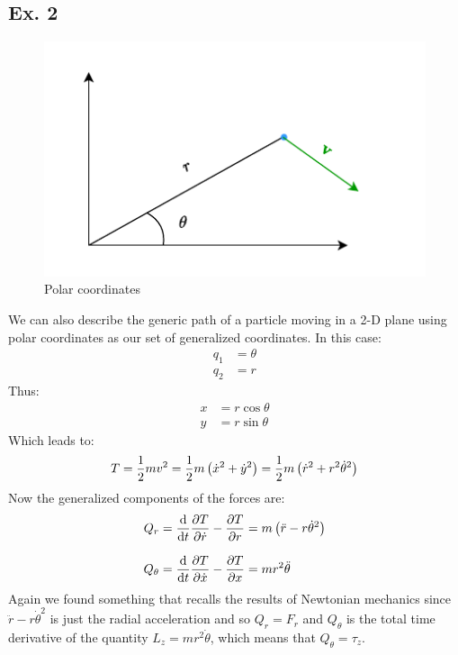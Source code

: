 \subsection{\textbf{Ex. 2}}
\begin{figure}[H]
    \centering
    \includegraphics[width=0.6\linewidth]{res/svg/polar_coordinates_free.drawio}
    \caption{Polar coordinates}
\end{figure}
We can also describe the generic path of a particle moving in a 2-D plane using polar coordinates as our set of generalized coordinates. In this case:
\begin{equation}
  \begin{split}
    q_1 &= \theta \\[8pt]
    q_2 &= r
  \end{split}
\end{equation}
Thus:
\begin{equation}
  \begin{split}
    x &= r\cos\theta \\[8pt]
    y &= r\sin\theta
  \end{split}
\end{equation}
Which leads to:
\begin{equation}
  T = \dfrac{1}{2}mv^2 = \dfrac{1}{2}m\left(\dot{x}^2 + \dot{y}^2\right) = \dfrac{1}{2}m\left(\dot{r}^2 + r^2\dot{\theta}^2\right)
\end{equation}
Now the generalized components of the forces are:
\begin{equation}
  \begin{split}
    Q_r &= \dv{}{t}\pdv{T}{\dot{r}} - \pdv{T}{r} = m\brackets{\ddot{r} - r\dot{\theta}^2} \\[8pt]
    Q_\theta &= \dv{}{t}\pdv{T}{\dot{x}} -\pdv{T}{x} = mr^2\ddot{\theta}
  \end{split}
\end{equation}
Again we found something that recalls the results of Newtonian mechanics since $\ddot{r} - r\dot{\theta}^2$ is just the radial acceleration and so $Q_r = F_r$ and $Q_\theta$ is the total time derivative of the quantity $L_z = mr^2\dot{\theta}$, which means that $Q_\theta = \tau_z$.
